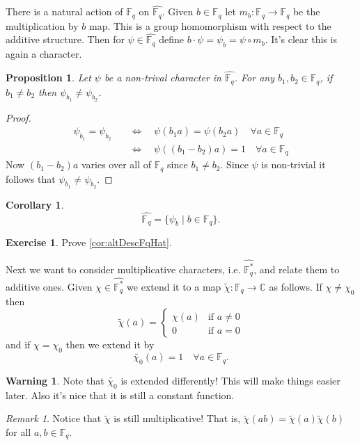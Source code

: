 \documentclass[11pt]{article}
\newcommand{\BB}[1]{\mathbb{#1}} %
\newcommand{\CC}{\BB{C}}
\newcommand{\FF}{\BB{F}}
\newcommand{\st}{\mid}
\renewcommand{\hat}{\widehat}
\theoremstyle{plain}
\newtheorem{prop}[propositioncounter]{Proposition}
\newtheorem{cor}[corollarycounter]{Corollary}
\theoremstyle{definition}
\newtheorem{excer}[exercisecounter]{Exercise}
\newtheorem{warn}[warniningcounter]{Warning}
\theoremstyle{remark}
\newtheorem{rem}[remarkcounter]{Remark}
\begin{document}
There is a natural action of $\FF_q$ on $\hat{\FF_q}$. Given $b\in \FF_q$ let $m_b:\FF_q\to \FF_q$ be the multiplication by $b$ map. This is a group homomorphism with respect to the additive structure. Then for $\psi\in\hat{\FF_q}$ define $b\cdot\psi = \psi_b = \psi\circ m_b$. It's clear this is again a character.

\begin{prop}
	 Let $\psi$ be a non-trival character in $\hat{\FF_q}$. For any $b_1,b_2\in\FF_q$, if $b_1\neq b_2$ then $\psi_{b_1}\neq \psi_{b_2}$.
\end{prop}
\begin{proof}
	\begin{align*}
		\psi_{b_1} = \psi_{b_2} \quad&\Leftrightarrow\quad \psi(b_1a) = \psi(b_2a) \quad\forall a\in\FF_q
		\\
		&\Leftrightarrow\quad \psi((b_1 - b_2)a) = 1 \quad\forall a\in\FF_q
	\end{align*}
	Now $(b_1 - b_2)a$ varies over all of $\FF_q$ since $b_1\neq b_2$. Since $\psi$ is non-trivial it follows that $\psi_{b_1}\neq\psi_{b_2}$.
\end{proof}

\begin{cor}\label{cor:altDescFqHat}
	$$\hat{\FF_q} = \{\psi_b \st b\in\FF_q \}.$$
\end{cor}
\begin{excer}
	Prove \autoref{cor:altDescFqHat}.
\end{excer}

Next we want to consider multiplicative characters, i.e. $\hat{\FF_q^*}$, and relate them to additive ones. Given $\chi\in\hat{\FF_q^*}$ we extend it to a map $\widetilde{\chi}:\FF_q \to \CC$ as follows. If $\chi\neq\chi_0$ then
$$
\widetilde{\chi}(a) =
\begin{cases}
	\chi(a) &\text{if $a\neq 0$}
	\\
	0 &\text{if $a=0$}
\end{cases}
$$
and if $\chi = \chi_0$ then we extend it by
$$
\widetilde{\chi_0}(a) = 1 \quad \forall a\in\FF_q.
$$

\begin{warn}\label{warn:extensionsOfChars}
	Note that $\widetilde{\chi_0}$ is extended differently! This will make things easier later. Also it's nice that it is still a constant function.
\end{warn}

\begin{rem}
	Notice that $\widetilde{\chi}$ is still multiplicative! That is, $\widetilde{\chi}(ab) = \widetilde{\chi}(a)\widetilde{\chi}(b)$ for all $a,b\in\FF_q$.
\end{rem}
\end{document}
